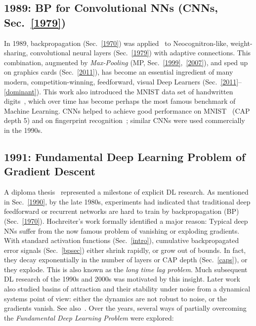 \documentclass[letterpaper]{article}
\begin{document}
\begin{sloppypar}
\subsection{1989: BP for Convolutional NNs (CNNs, Sec.~\ref{1979})}
\label{1989}
In 1989, backpropagation (Sec.~\ref{1970}) was applied~\citep{LeCun:89,LeCun:90,LeCun:98} 
to Neocognitron-like, weight-sharing,
convolutional 
neural layers (Sec.~\ref{1979}) with adaptive connections.
This combination, augmented by {\em Max-Pooling} (MP, Sec.~\ref{1999},~\ref{2007}),
and sped up on graphics cards (Sec.~\ref{2011}),  
has become an 
essential ingredient of many modern, competition-winning, 
feedforward, visual Deep Learners (Sec.~\ref{2011}--\ref{dominant}).
This work also introduced
the MNIST data set of handwritten digits~\citep{LeCun:89}, which over time has become 
perhaps the most famous benchmark of Machine Learning. 
CNNs helped to 
achieve good performance on MNIST~\citep{LeCun:90} (CAP depth 5)
and on  fingerprint recognition~\citep{baldi93finger};
similar CNNs were used commercially in the 1990s.




\subsection{1991: Fundamental Deep Learning Problem of Gradient Descent}
\label{1991a}
 
A diploma thesis~\citep{Hochreiter:91} represented a milestone of explicit
DL research. As mentioned in Sec.~\ref{1990}, by the late 1980s, 
experiments had indicated that traditional 
deep feedforward or recurrent networks are hard to
train by backpropagation (BP) (Sec.~\ref{1970}). Hochreiter's work
formally identified a major reason: Typical deep NNs suffer from the now famous problem of vanishing or exploding gradients. With standard activation functions (Sec.~\ref{intro}), cumulative 
 backpropagated error signals (Sec.~\ref{bpsec})  either shrink rapidly, or grow out of bounds. In fact, they decay exponentially in the number of layers or CAP depth (Sec.~\ref{caps}), 
or they explode. 
This is also known as the {\em long time lag problem}.
Much subsequent DL research of the 1990s and 2000s was motivated by this insight. 
Later work~\citep{Bengio:94} also studied
basins of attraction and their stability under noise 
from a dynamical systems point of view: either the 
dynamics are not robust to noise, or the gradients vanish. See also~\citep{Hochreiter:01book,Tino03NC}.
Over the years, several ways of partially overcoming the {\em Fundamental Deep Learning Problem} were explored:


\end{sloppypar}
\end{document}
